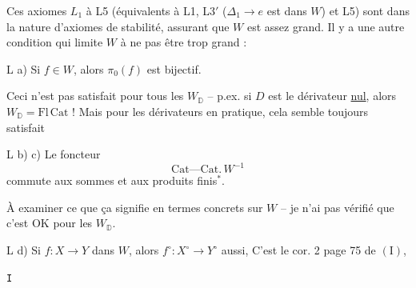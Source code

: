 Ces axiomes $L_1$ à L5 (équivalents à
L1, L3$'$ ($\mathbb{\Delta}_1\to e$ est dans $W$) et L5) sont dans
la nature d'axiomes de stabilité, assurant
que $W$ est assez grand. Il y a une autre
condition qui limite $W$ à ne pas être trop
grand :

L a) Si $f\in W$, alors $\pi_0(f)$ est bijectif.

Ceci n'est pas satisfait pour tous les $W_{\mathbb D}$
– p.ex. si $D$ est le dérivateur \uline{nul}, alors 
$W_{\mathbb D}=\mathrm{Fl}\,\mathrm{Cat}$ ! Mais pour les dérivateurs 
en pratique, cela semble toujours satisfait

L b) c) Le foncteur
\[
\mathrm{Cat}\text{---}\mathrm{Cat}.\,W^{-1}
\]
commute aux sommes  et aux produits finis$^{*}$.


À examiner ce que ça signifie en termes
concrets sur $W$ – je n'ai pas vérifié que
c'est OK pour les $W_{\mathbb D}$.

L d) Si $f:X\to Y$ dans $W$, alors $f^\circ:X^\circ\longrightarrow Y^\circ$ aussi,
C'est le cor. 2 page 75 de $(\mathrm I)$,



\texttt{\unsure{//*}\quad {}\quad I}


